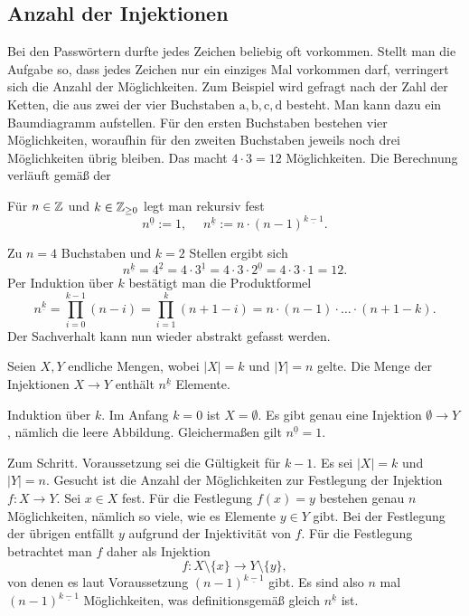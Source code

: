 \subsection{Anzahl der Injektionen}

Bei den Passwörtern durfte jedes Zeichen beliebig oft vorkommen.
Stellt man die Aufgabe so, dass jedes Zeichen nur ein einziges
Mal vorkommen darf, verringert sich die Anzahl der Möglichkeiten.
Zum Beispiel wird gefragt nach der Zahl der Ketten, die aus zwei der
vier Buchstaben $\mathrm{a,b,c,d}$ besteht. Man kann dazu ein Baumdiagramm
aufstellen. Für den ersten Buchstaben bestehen vier Möglichkeiten,
woraufhin für den zweiten Buchstaben jeweils noch drei Möglichkeiten
übrig bleiben. Das macht $4\cdot 3 = 12$ Möglichkeiten.
Die Berechnung verläuft gemäß der

\begin{Definition}\newlinefirst
Für $n\in\mathbb Z$ und $k\in\mathbb Z_{\ge 0}$ legt man rekursiv fest
\[n^{\underline 0} := 1,\quad\;
n^{\underline k} := n\cdot (n-1)^{\underline{k-1}}.\]
\end{Definition}

\noindent
Zu $n=4$ Buchstaben und $k=2$ Stellen ergibt sich
\[n^{\underline k} = 4^{\underline 2} = 4\cdot 3^{\underline 1}
= 4\cdot 3\cdot 2^{\underline 0} = 4\cdot 3\cdot 1 = 12.\]
Per Induktion über $k$ bestätigt man die Produktformel
\[n^{\underline k} = \prod_{i=0}^{k-1} (n-i) = \prod_{i=1}^k (n+1-i)
= n\cdot (n-1)\cdot\ldots\cdot (n+1-k).\]
Der Sachverhalt kann nun wieder abstrakt gefasst werden.

\begin{Satz}\newlinefirst
Seien $X,Y$ endliche Mengen, wobei $|X|=k$ und $|Y|=n$ gelte.
Die Menge der Injektionen $X\to Y$ enthält $n^{\underline k}$
Elemente.
\end{Satz}
\begin{Beweis}
Induktion über $k$. Im Anfang $k=0$ ist $X=\emptyset$. Es gibt
genau eine Injektion $\emptyset\to Y$, nämlich die leere Abbildung.
Gleichermaßen gilt $n^{\underline 0} = 1$.

Zum Schritt. Voraussetzung sei die Gültigkeit
für $k-1$. Es sei $|X|=k$ und $|Y|=n$. Gesucht ist die Anzahl
der Möglichkeiten zur Festlegung der Injektion $f\colon X\to Y$.
Sei $x\in X$ fest. Für die Festlegung $f(x)=y$ bestehen genau
$n$ Möglichkeiten, nämlich so viele, wie es Elemente $y\in Y$ gibt.
Bei der Festlegung der übrigen entfällt $y$ aufgrund der Injektivität
von $f$. Für die Festlegung betrachtet man $f$ daher als Injektion%
\[f\colon X\setminus\{x\}\to Y\setminus\{y\},\]
von denen es laut Voraussetzung $(n-1)^{\underline{k-1}}$ gibt. Es sind
also $n$ mal $(n-1)^{\underline{k-1}}$ Möglichkeiten, was definitionsgemäß
gleich $n^{\underline k}$ ist.\,\qedsymbol
\end{Beweis}


